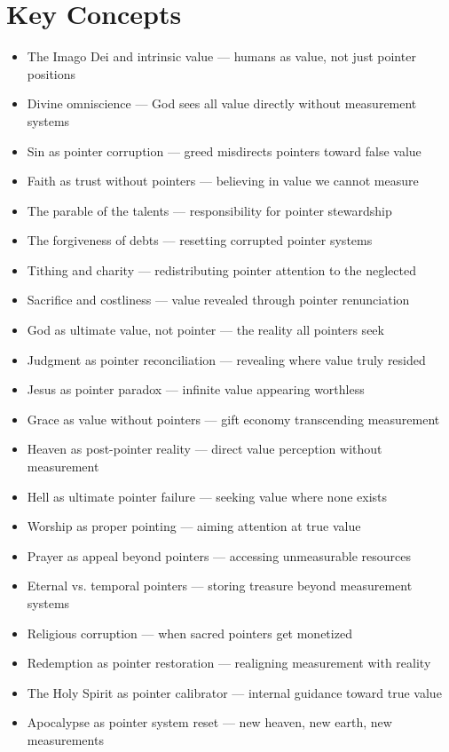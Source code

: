 \documentclass[11pt,oneside]{book}
\begin{document}
{{{{{{\section{Key Concepts}

\begin{itemize}
\item The Imago Dei and intrinsic value — humans as value, not just pointer positions
\item Divine omniscience — God sees all value directly without measurement systems
\item Sin as pointer corruption — greed misdirects pointers toward false value
\item Faith as trust without pointers — believing in value we cannot measure
\item The parable of the talents — responsibility for pointer stewardship
\item The forgiveness of debts — resetting corrupted pointer systems
\item Tithing and charity — redistributing pointer attention to the neglected
\item Sacrifice and costliness — value revealed through pointer renunciation
\item God as ultimate value, not pointer — the reality all pointers seek
\item Judgment as pointer reconciliation — revealing where value truly resided
\item Jesus as pointer paradox — infinite value appearing worthless
\item Grace as value without pointers — gift economy transcending measurement
\item Heaven as post-pointer reality — direct value perception without measurement
\item Hell as ultimate pointer failure — seeking value where none exists
\item Worship as proper pointing — aiming attention at true value
\item Prayer as appeal beyond pointers — accessing unmeasurable resources
\item Eternal vs. temporal pointers — storing treasure beyond measurement systems
\item Religious corruption — when sacred pointers get monetized
\item Redemption as pointer restoration — realigning measurement with reality
\item The Holy Spirit as pointer calibrator — internal guidance toward true value
\item Apocalypse as pointer system reset — new heaven, new earth, new measurements
\end{itemize}

}}}}}}
\end{document}
